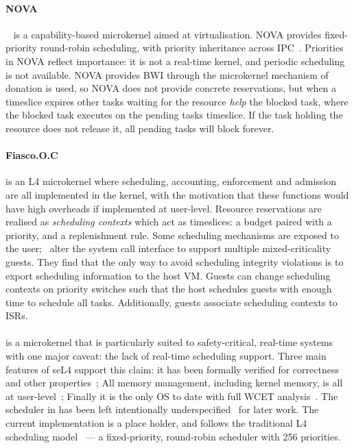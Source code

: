 \paragraph{NOVA}~\citep{Steinberg_Kauer_10} is a capability-based microkernel aimed at virtualisation. 
NOVA provides fixed-priority round-robin scheduling, with priority inheritance across IPC~\citep{Steinberg_BK_10}.
Priorities in NOVA reflect importance: it is not a real-time kernel, and periodic scheduling is not available.  
NOVA provides \gls{BWI} through the microkernel mechanism of donation is used, so NOVA does not
provide concrete reservations, but when a timeslice expires other tasks waiting for the resource
\emph{help} the blocked task, where the blocked task executes on the pending tasks timeslice.
If the task holding the resource does not release it, all pending tasks will block forever.

\paragraph{Fiasco.O.C} is an L4 microkernel where scheduling, accounting, enforcement and admission
are all implemented in the kernel, with the motivation that these functions would have high
overheads if implemented at user-level.  Resource reservations are realised as \emph{scheduling
contexts} which act as timeslices: a budget paired with a priority, and a replenishment rule.  Some
scheduling mechanisms are exposed to the user;~\citet{Lackorzynski_WVH_12} alter the system call
interface to support multiple mixed-criticality guests.  They find that the only way to avoid
scheduling integrity violations is to export scheduling information to the host \gls{VM}.  Guests
can change scheduling contexts on priority switches such that the host schedules guests with enough
time to schedule all tasks.  Additionally, guests associate scheduling contexts to \glspl{ISR}.

\paragraph{\selfour} is a microkernel that is particularly suited to safety-critical, real-time systems
with one major caveat: the lack of real-time scheduling support.  Three main features of seL4
support this claim: it has been formally verified for correctness~\citep{Klein_EHACDEEKNSTW_09} and
other properties~\citep{Sewell_WGMAK_11}; All memory management, including kernel memory, is all at
user-level~\citep{Elkaduwe_Derrin_06}; Finally it is the only \gls{OS} to date with full \gls{WCET}
analysis~\citep{Blackham_SCRH_11}.  The scheduler in \selfour has been left intentionally
underspecified~\citep{Petters_EH_12} for later work.  The current implementation is a place holder,
and follows the traditional L4 scheduling model~\citep{Ruocco_06} --- a fixed-priority, round-robin
scheduler with 256 priorities.

